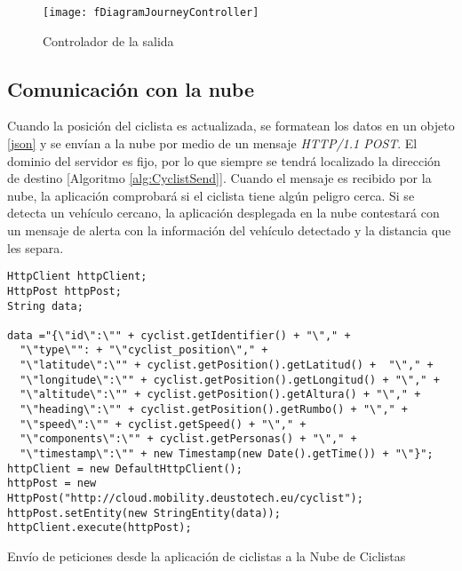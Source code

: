 \begin{figure}[H]
	\begin{center}
	\texttt{[image: fDiagramJourneyController]}
	\caption{Controlador de la salida}
	\label{figure:DiagramController}
	\end{center}
\end{figure}

\subsection{Comunicación con la nube}\label{ssection:comunicacion_nube}
Cuando la posición del ciclista es actualizada, se formatean los datos en un objeto
\ref{json} y se envían a la nube por medio de un mensaje \emph{HTTP/1.1 POST}. El
dominio del servidor es fijo, por lo que siempre se tendrá localizado la dirección
de destino [Algoritmo \ref{alg:CyclistSend}]. Cuando el mensaje es recibido por
la nube, la aplicación comprobará si el ciclista tiene algún peligro cerca. Si
se detecta un vehículo cercano, la aplicación desplegada en la nube contestará con
un mensaje de alerta con la información del vehículo detectado y la distancia
que les separa.

\begin{listing}
	\begin{minipage}{.4\textwidth}
		\begin{verbatim}
HttpClient httpClient;
HttpPost httpPost;
String data;

data ="{\"id\":\"" + cyclist.getIdentifier() + "\"," +
  "\"type\"": + "\"cyclist_position\"," +
  "\"latitude\":\"" + cyclist.getPosition().getLatitud() +  "\"," +
  "\"longitude\":\"" + cyclist.getPosition().getLongitud() + "\"," +
  "\"altitude\":\"" + cyclist.getPosition().getAltura() + "\"," +
  "\"heading\":\"" + cyclist.getPosition().getRumbo() + "\"," +
  "\"speed\":\"" + cyclist.getSpeed() + "\"," +
  "\"components\":\"" + cyclist.getPersonas() + "\"," +
  "\"timestamp\":\"" + new Timestamp(new Date().getTime()) + "\"}";
httpClient = new DefaultHttpClient();
httpPost = new HttpPost("http://cloud.mobility.deustotech.eu/cyclist");
httpPost.setEntity(new StringEntity(data));
httpClient.execute(httpPost);
		\end{verbatim}
	\end{minipage}
	\caption{Envío de peticiones desde la aplicación de ciclistas a la Nube de
	Ciclistas}\label{alg:CyclistSend}
\end{listing}

